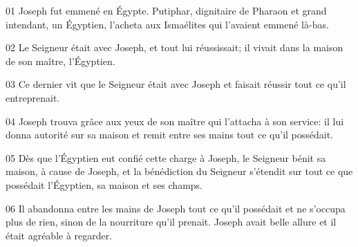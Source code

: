 01 Joseph fut emmené en Égypte. Putiphar, dignitaire de Pharaon et grand intendant, un Égyptien, l’acheta aux Ismaélites qui l’avaient emmené là-bas.

02 Le Seigneur était avec Joseph, et tout lui réussissait; il vivait dans la maison de son maître, l’Égyptien.

03 Ce dernier vit que le Seigneur était avec Joseph et faisait réussir tout ce qu’il entreprenait.

04 Joseph trouva grâce aux yeux de son maître qui l’attacha à son service: il lui donna autorité sur sa maison et remit entre ses mains tout ce qu’il possédait.

05 Dès que l’Égyptien eut confié cette charge à Joseph, le Seigneur bénit sa maison, à cause de Joseph, et la bénédiction du Seigneur s’étendit sur tout ce que possédait l’Égyptien, sa maison et ses champs.

06 Il abandonna entre les mains de Joseph tout ce qu’il possédait et ne s’occupa plus de rien, sinon de la nourriture qu’il prenait. Joseph avait belle allure et il était agréable à regarder.